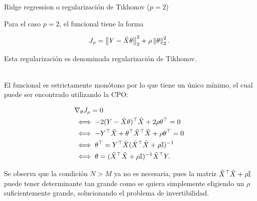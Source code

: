 \documentclass[handout, 9pt]{beamer}
\begin{document}
\begin{frame}{Ridge regression o regularización de Tikhonov ($p=2$)}

Para el caso $p=2$, el funcional tiene la forma

\begin{equation*}
	J_\rho = \left\lVert Y-\tilde{X}\theta\right\rVert_2^2 + \rho\left\lVert\theta\right\rVert_2^2.
	\label{eq:reg_least_squares}
\end{equation*}

Esta regularización es denominada regularización de Tikhonov.\\~\ \pause

El funcional es estrictamente monótono por lo que tiene un único mínimo, el cual puede ser encontrado utilizando la CPO:

\begin{align*}
	&\nabla_\theta J_\rho = 0\nonumber\\
	&\iff -2(Y-\tilde{X}\theta)^\top\tilde{X} + 2\rho\theta^\top =0\nonumber\\
	&\iff -Y^\top\tilde{X} +\theta^\top\tilde{X}^\top\tilde{X} + \rho\theta^\top= 0\nonumber\\
	&\iff \theta^\top = Y^\top \tilde{X}(\tilde{X}^\top\tilde{X} + \rho{\mathbb I})^{-1}\nonumber\\
	&\iff \theta = (\tilde{X}^\top\tilde{X}+\rho{\mathbb I})^{-1}\tilde{X}^\top Y.
\end{align*}\pause
	
Se observa que la condición $N>M$ ya no es necesaria, pues la matriz $\tilde{X}^\top\tilde{X}+\rho{\mathbb I}$ puede tener determinante tan grande como se quiera simplemente eligiendo un $\rho$ suficientemente grande, solucionando el problema de invertibilidad.	
	
\end{frame}
\end{document}
